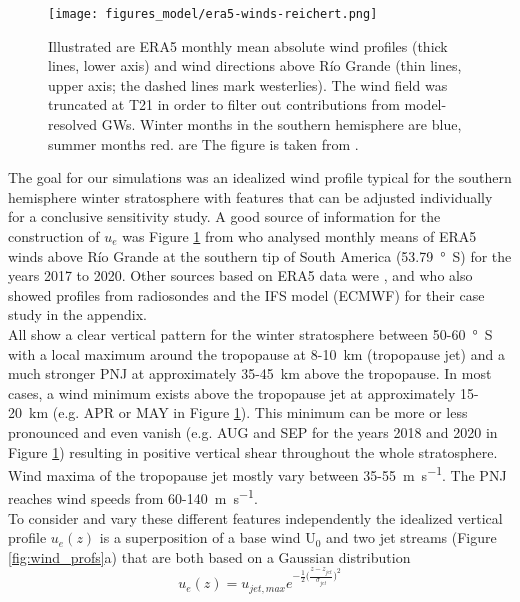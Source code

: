 \begin{figure}[tbp]
    \centering
    \texttt{[image: figures\_model/era5-winds-reichert.png]}
    \caption{Illustrated are ERA5 monthly mean absolute wind profiles (thick lines, lower axis) and wind directions above Río Grande (thin lines, upper axis; the dashed lines mark westerlies). The wind field was truncated at T21 in order to filter out contributions from model-resolved GWs. Winter months in the southern hemisphere are blue, summer months red. are The figure is taken from \textcite[]{reichert_characterization_2022}.}
    \label{fig:era5-winds-reichert}
\end{figure} 
The goal for our simulations was an idealized wind profile typical for the southern hemisphere winter stratosphere with features that can be adjusted individually for a conclusive sensitivity study. A good source of information for the construction of $u_e$ was Figure \ref{fig:era5-winds-reichert} from \textcite[]{reichert_characterization_2022} who analysed monthly means of ERA5 winds above Río Grande at the southern tip of South America (\SI{53.79}{\degree S}) for the years 2017 to 2020. Other sources based on ERA5 data were \textcite[]{rapp_southtrac-gw_2021}, \textcite[]{mixa_nonlinear_2021} and \textcite[]{dornbrack_stratospheric_2022} who also showed profiles from radiosondes and the IFS model (ECMWF) for their case study in the appendix. \\
All show a clear vertical pattern for the winter stratosphere between 50-\SI{60}{\degree S} with a local maximum around the tropopause at 8-\SI{10}{\kilo\meter} (tropopause jet) and a much stronger PNJ at approximately 35-\SI{45}{\kilo\meter} above the tropopause. In most cases, a wind minimum exists above the tropopause jet at approximately 15-\SI{20}{\kilo\meter} (e.g. APR or MAY in Figure \ref{fig:era5-winds-reichert}). This minimum can be more or less pronounced and even vanish (e.g. AUG and SEP for the years 2018 and 2020 in Figure \ref{fig:era5-winds-reichert}) resulting in positive vertical shear throughout the whole stratosphere. Wind maxima of the tropopause jet mostly vary between 35-\SI{55}{\meter\per\second}. The PNJ reaches wind speeds from 60-\SI{140}{\meter\per\second}. \\
To consider and vary these different features independently the idealized vertical profile $u_e(z)$ is a superposition of a base wind U$_0$ and two jet streams (Figure \ref{fig:wind_profs}a) that are both based on a Gaussian distribution
\begin{equation}
    u_e(z) = u_{jet,max} e^{-\frac{1}{2} \bigl(\frac{z-z_{jet}}{\sigma_{jet}}\bigr)^2}
    \label{equ:wind-distribution}
\end{equation}
